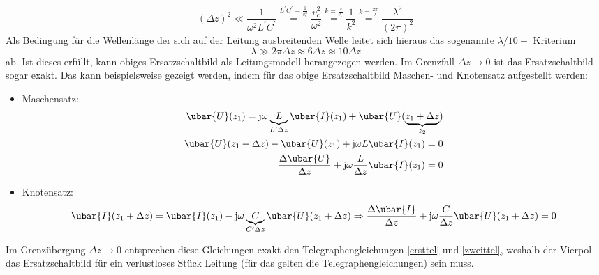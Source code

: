 \begin{equation}
	(\Delta z)^{2} \ll \frac{1}{\omega^{2} L^{\prime} C^{\prime}} \stackrel{L^{\prime} C^{\prime}=\frac{1}{v_\mathrm{c}^{2}}}{=} \frac{v_\mathrm{c}^{2}}{\omega^{2}} \stackrel{k=\frac{\omega}{v_\mathrm{c}}}{=} \frac{1}{k^{2}} \stackrel{k=\frac{2 \pi}{\lambda}}{=} \frac{\lambda^{2}}{(2 \pi)^{2}} 
\end{equation}
Als Bedingung für die Wellenlänge der sich auf der Leitung ausbreitenden Welle leitet sich hieraus das sogenannte $\lambda / 10-$ Kriterium
\begin{equation}
	\lambda \gg 2 \pi \Delta z \approx 6 \Delta z \approx 10 \Delta z 
\end{equation}
ab. Ist dieses erfüllt, kann obiges Ersatzschaltbild als Leitungsmodell herangezogen werden. Im Grenzfall $\Delta z \to 0$ ist das Ersatzschaltbild sogar exakt. Das kann beispielsweise gezeigt werden, indem für das obige Ersatzschaltbild Maschen- und Knotensatz aufgestellt werden:
\begin{itemize}
	\item  Maschensatz:
	\begin{equation}\begin{split}
			\ubar{U}(z_1) = \mathrm{j}\omega \underbrace{L}_{L'\Delta z}  \ubar{I}(z_1) +  \ubar{U}(\underbrace{z_1+\Delta z}_{z_2})\\
			\ubar{U}(z_1+\Delta z) - \ubar{U}(z_1) + \mathrm{j}\omega L  \ubar{I}(z_1) =0  \\
			\frac{\Delta  \ubar{U}}{\Delta z} + \mathrm{j}\omega \frac{L}{\Delta z}  \ubar{I}(z_1) =0
	\end{split}\end{equation}
	
	\item Knotensatz:
	\begin{equation}
		\ubar{I}(z_1+\Delta z) =  \ubar{I}(z_1) - \mathrm{j}\omega \underbrace{C}_{C'\Delta z}  \ubar{U}(z_1+\Delta z) \Rightarrow \frac{\Delta  \ubar{I}}{\Delta z} + \mathrm{j}\omega \frac{C}{\Delta z}  \ubar{U}(z_1+\Delta z) = 0
	\end{equation}
\end{itemize}
Im Grenzübergang $\Delta z \to 0$ entsprechen diese Gleichungen exakt den Telegraphengleichungen \ref{ersttel} und \ref{zweittel}, weshalb der Vierpol das Ersatzschaltbild für ein verlustloses Stück Leitung (für das gelten die Telegraphengleichungen) sein muss.
